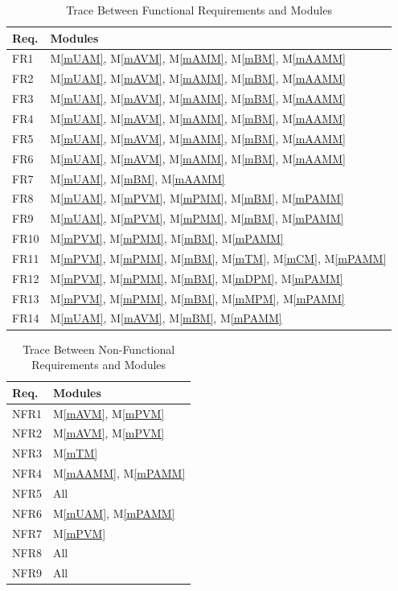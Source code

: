 \documentclass[12pt, titlepage]{article}
\newcommand{\mref}[1]{M\ref{#1}}
\begin{document}
\begin{table}[H]
\centering
\begin{tabular}{p{} p{}}
\toprule
\textbf{Req.} & \textbf{Modules}\\
\midrule
FR1 & \mref{mUAM}, \mref{mAVM}, \mref{mAMM}, \mref{mBM}, \mref{mAAMM}\\
FR2 & \mref{mUAM}, \mref{mAVM}, \mref{mAMM}, \mref{mBM}, \mref{mAAMM}\\
FR3 & \mref{mUAM}, \mref{mAVM}, \mref{mAMM}, \mref{mBM}, \mref{mAAMM}\\
FR4 & \mref{mUAM}, \mref{mAVM}, \mref{mAMM}, \mref{mBM}, \mref{mAAMM}\\
FR5 & \mref{mUAM}, \mref{mAVM}, \mref{mAMM}, \mref{mBM}, \mref{mAAMM}\\
FR6 & \mref{mUAM}, \mref{mAVM}, \mref{mAMM}, \mref{mBM}, \mref{mAAMM}\\
FR7 & \mref{mUAM}, \mref{mBM}, \mref{mAAMM}\\
FR8 & \mref{mUAM}, \mref{mPVM}, \mref{mPMM}, \mref{mBM}, \mref{mPAMM}\\
FR9 & \mref{mUAM}, \mref{mPVM}, \mref{mPMM}, \mref{mBM}, \mref{mPAMM}\\
FR10 & \mref{mPVM}, \mref{mPMM}, \mref{mBM}, \mref{mPAMM}\\
FR11 & \mref{mPVM}, \mref{mPMM}, \mref{mBM}, \mref{mTM}, \mref{mCM}, \mref{mPAMM}\\
FR12 & \mref{mPVM}, \mref{mPMM}, \mref{mBM}, \mref{mDPM}, \mref{mPAMM}\\
FR13 & \mref{mPVM}, \mref{mPMM}, \mref{mBM}, \mref{mMPM}, \mref{mPAMM}\\
FR14 & \mref{mUAM}, \mref{mAVM}, \mref{mBM}, \mref{mPAMM}\\
\bottomrule
\end{tabular}
\caption{Trace Between Functional Requirements and Modules}
\label{TblRT}
\end{table}

\begin{table}[H]
\centering
\begin{tabular}{p{} p{}}
\toprule
\textbf{Req.} & \textbf{Modules}\\
\midrule
NFR1 & \mref{mAVM}, \mref{mPVM}\\
NFR2 & \mref{mAVM}, \mref{mPVM}\\
NFR3 & \mref{mTM}\\
NFR4 & \mref{mAAMM}, \mref{mPAMM}\\
NFR5 & All \\
NFR6 & \mref{mUAM}, \mref{mPAMM}\\
NFR7 & \mref{mPVM}\\
NFR8 & All \\
NFR9 & All \\
\bottomrule
\end{tabular}
\caption{Trace Between Non-Functional Requirements and Modules}
\label{TblRT}
\end{table}
\end{document}
